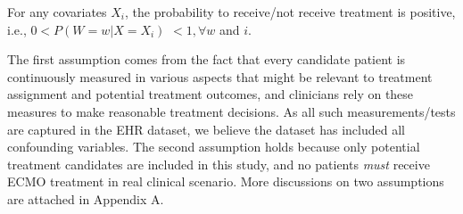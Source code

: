 \begin{assumption}[Positivity]
For any covariates $X_i$, the probability to receive/not receive treatment is positive, i.e., $0 < P(W = w|X = X_i)$ $< 1, \forall w$ and $i$.
\end{assumption}

The first assumption comes from the fact that every candidate patient is continuously measured in various aspects that might be relevant to treatment assignment and potential treatment outcomes, and clinicians rely on these measures to make reasonable treatment decisions. As all such measurements/tests are captured in the EHR dataset, we believe the dataset has included all confounding variables. The second assumption holds because only potential treatment candidates are included in this study, and no patients \textit{must} receive ECMO treatment in real clinical scenario. 
More discussions on two assumptions are attached in Appendix A. 



